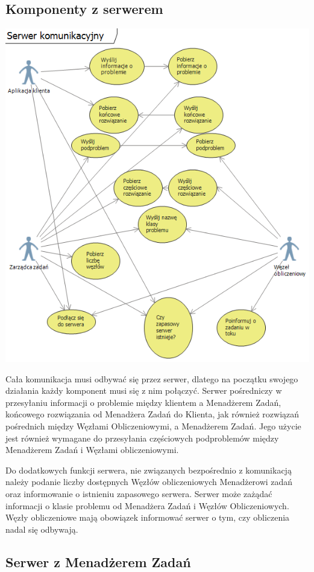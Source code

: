 \documentclass[12pt,a4paper,titlepage]{report}
\begin{document}
			\subsection{Komponenty z serwerem}
			
			\includegraphics[width=\textwidth]{img/diagram05.png}	
			
			Cała komunikacja musi odbywać się przez serwer, dlatego na początku swojego działania każdy komponent musi się z nim połączyć. Serwer pośredniczy w przesyłaniu informacji o problemie między klientem a Menadżerem Zadań, końcowego rozwiązania od Menadżera Zadań do Klienta, jak również rozwiązań pośrednich między Węzłami Obliczeniowymi, a Menadżerem Zadań. Jego użycie jest również wymagane do przesyłania częściowych podproblemów między Menadżerem Zadań i Węzłami obliczeniowymi.
			
			Do dodatkowych funkcji serwera, nie związanych bezpośrednio z komunikacją należy podanie liczby dostępnych Węzłów obliczeniowych Menadżerowi zadań oraz informowanie o istnieniu zapasowego serwera. Serwer może zażądać informacji o klasie problemu od Menadżera Zadań i Węzłów Obliczeniowych. Węzły obliczeniowe mają obowiązek informować serwer o tym, czy obliczenia nadal się odbywają.
			\subsection{Serwer z Menadżerem Zadań}
			
\end{document}
